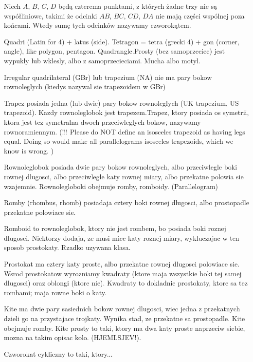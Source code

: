 %

\begin{definition}[czworokąt]
    Niech $A$, $B$, $C$, $D$ będą czterema punktami, z których żadne trzy nie są współliniowe, takimi że odcinki $AB$, $BC$, $CD$, $DA$ nie mają części wspólnej poza końcami.
    Wtedy sumę tych odcinków nazywamy czworokątem.
\end{definition}


Quadri (Latin for 4) + latus (side). Tetragon = tetra (grecki 4) + gon (corner, angle), like polygon, pentagon. Quadrangle.Prosty (bez samoprzeciec) jest wypukly lub wklesly, albo z samoprzecieciami. Mucha albo motyl.

Irregular quadrilateral (GBr) lub trapezium (NA) nie ma pary bokow rownoleglych (kiedys nazywal sie trapezoidem w GBr)

Trapez posiada jedna (lub dwie) pary bokow rownoleglych (UK trapezium, US trapezoid). Kazdy rownoleglobok jest trapezem.Trapez, ktory posiada os symetrii, ktora jest tez symetralna dwoch przeciwleglych bokow, nazywamy rownoramiennym. (!!! Please do NOT define an isosceles trapezoid as having legs equal. Doing so would make all parallelograms isosceles trapezoids, which we know is wrong. )

Rownoleglobok posiada dwie pary bokow rownoleglych, albo przeciwlegle boki rownej dlugosci, albo przeciwlegle katy rownej miary, albo przekatne polowia sie wzajemnie. Rownolegloboki obejmuje romby, romboidy. (Parallelogram)

Romby (rhombus, rhomb) posiadaja cztery boki rownej dlugosci, albo prostopadle przekatne polowiace sie.

Romboid to rownoleglobok, ktory nie jest rombem, bo posiada boki roznej dlugosci. Niektorzy dodaja, ze musi miec katy roznej miary, wykluczajac w ten sposob prostokaty. Rzadko uzywana klasa.

Prostokat ma cztery katy proste, albo przekatne rownej dlugosci polowiace sie. Wsrod prostokatow wyrozniamy kwadraty (ktore maja wszystkie boki tej samej dlugosci) oraz oblongi (ktore nie). Kwadraty to dokladnie prostokaty, ktore sa tez rombami; maja rowne boki o katy.

Kite ma dwie pary sasiednich bokow rownej dlugosci, wiec jedna z przekatnych dzieli go na przystajace trojkaty. Wynika stad, ze przekatne sa prostopadle. Kite obejmuje romby. Kite prosty to taki, ktory ma dwa katy proste naprzeciw siebie, mozna na takim opisac kolo. (HJEMLSJEV!).

Czworokat cykliczny to taki, ktory...

